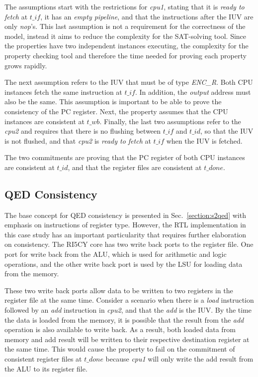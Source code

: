 The assumptions start with the restrictions for \textit{cpu1}, stating that it is \textit{ready to fetch} at $t\_if$, it has an \textit{empty pipeline}, and that the instructions after the IUV are only \textit{nop}’s. This last assumption is not a requirement for the correctness of the model, instead it aims to reduce the complexity for the SAT-solving tool. Since the \SSQED{} properties have two independent instances executing, the complexity for the property checking tool and therefore the time needed for proving each property grows rapidly.

The next assumption refers to the IUV that must be of type \textit{ENC\_R}. Both CPU instances fetch the same instruction at $t\_if$. In addition, the \textit{output} address must also be the same. This assumption is important to be able to prove the consistency of the PC register. Next, the property assumes that the CPU instances are consistent at $t\_wb$. Finally, the last two assumptions refer to the \textit{cpu2} and requires that there is no flushing between $t\_if$ and $t\_id$, so that the IUV is not flushed, and that \textit{cpu2} is \textit{ready to fetch} at $t\_if$ when the IUV is fetched.

The two commitments are proving that the PC register of both CPU instances are consistent at $t\_id$, and that the register files are consistent at $t\_done$.

\subsection*{QED Consistency}

The base concept for QED consistency is presented in Sec.~\ref{section:s2qed} with emphasis on instructions of register type. However, the RTL implementation in this case study has an important particularity that requires further elaboration on consistency. The RI5CY core has two write back ports to the register file. One port for write back from the ALU, which is used for arithmetic and logic operations, and the other write back port is used by the LSU for loading data from the memory.

These two write back ports allow data to be written to two registers in the register file at the same time. Consider a scenario when there is a \textit{load} instruction followed by an \textit{add} instruction in \textit{cpu2}, and that the \textit{add} is the IUV. By the time the data is loaded from the memory, it is possible that the result from the \textit{add} operation is also available to write back. As a result, both loaded data from memory and add result will be written to their respective destination register at the same time. This would cause the \SSQED{} property to fail on the commitment of consistent register files at $t\_done$ because \textit{cpu1} will only write the add result from the ALU to its register file.

